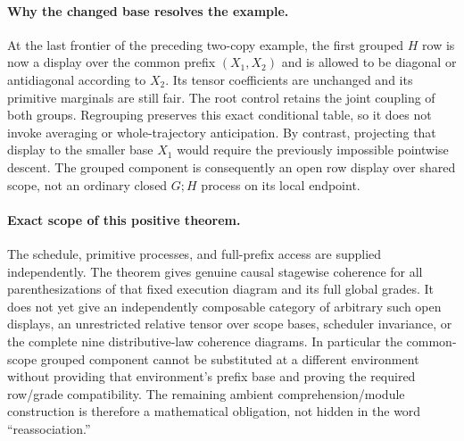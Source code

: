 \documentclass[11pt]{article}
\begin{document}
\paragraph{Why the changed base resolves the example.} At the last frontier of the preceding two-copy example, the first grouped $H$ row is now a display over the common prefix $(X_1,X_2)$ and is allowed to be diagonal or antidiagonal according to $X_2$. Its tensor coefficients are unchanged and its primitive marginals are still fair. The root control retains the joint coupling of both groups. Regrouping preserves this exact conditional table, so it does not invoke averaging or whole-trajectory anticipation. By contrast, projecting that display to the smaller base $X_1$ would require the previously impossible pointwise descent. The grouped component is consequently an open row display over shared scope, not an ordinary closed $G;H$ process on its local endpoint.

\paragraph{Exact scope of this positive theorem.} The schedule, primitive processes, and full-prefix access are supplied independently. The theorem gives genuine causal stagewise coherence for all parenthesizations of that fixed execution diagram and its full global grades. It does not yet give an independently composable category of arbitrary such open displays, an unrestricted relative tensor over scope bases, scheduler invariance, or the complete nine distributive-law coherence diagrams. In particular the common-scope grouped component cannot be substituted at a different environment without providing that environment's prefix base and proving the required row/grade compatibility. The remaining ambient comprehension/module construction is therefore a mathematical obligation, not hidden in the word ``reassociation.''
\end{document}
